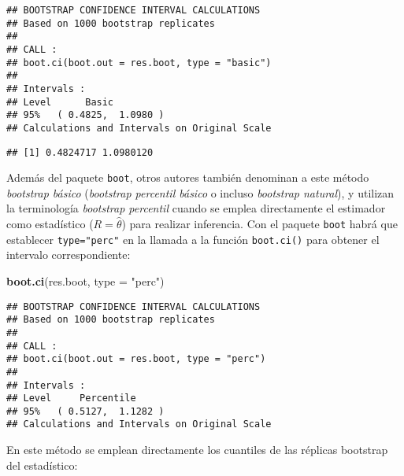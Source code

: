 \documentclass[
]{book}
\newenvironment{Shaded}{\begin{snugshade}}{\end{snugshade}}
\newcommand{\CommentTok}[1]{\textcolor[rgb]{0.56,0.35,0.01}{\textit{#1}}}
\newcommand{\DataTypeTok}[1]{\textcolor[rgb]{0.13,0.29,0.53}{#1}}
\newcommand{\DecValTok}[1]{\textcolor[rgb]{0.00,0.00,0.81}{#1}}
\newcommand{\KeywordTok}[1]{\textcolor[rgb]{0.13,0.29,0.53}{\textbf{#1}}}
\newcommand{\NormalTok}[1]{#1}
\newcommand{\OperatorTok}[1]{\textcolor[rgb]{0.81,0.36,0.00}{\textbf{#1}}}
\newcommand{\StringTok}[1]{\textcolor[rgb]{0.31,0.60,0.02}{#1}}
\theoremstyle{definition}
\theoremstyle{definition}
\theoremstyle{definition}
\theoremstyle{remark}
\begin{document}
\begin{verbatim}
## BOOTSTRAP CONFIDENCE INTERVAL CALCULATIONS
## Based on 1000 bootstrap replicates
## 
## CALL : 
## boot.ci(boot.out = res.boot, type = "basic")
## 
## Intervals : 
## Level      Basic         
## 95%   ( 0.4825,  1.0980 )  
## Calculations and Intervals on Original Scale
\end{verbatim}

\begin{Shaded}
\end{Shaded}

\begin{verbatim}
## [1] 0.4824717 1.0980120
\end{verbatim}

Además del paquete \texttt{boot}, otros autores también denominan a este método
\emph{bootstrap básico} (\emph{bootstrap percentil básico} o incluso \emph{bootstrap natural}),
y utilizan la terminología \emph{bootstrap percentil} cuando se emplea
directamente el estimador como estadístico (\(R = \hat \theta\)) para
realizar inferencia. Con el paquete \texttt{boot} habrá que establecer \texttt{type="perc"}
en la llamada a la función \texttt{boot.ci()} para obtener el intervalo
correspondiente:

\begin{Shaded}
\begin{Highlighting}[]
\KeywordTok{boot.ci}\NormalTok{(res.boot, }\DataTypeTok{type =} \StringTok{"perc"}\NormalTok{)}
\end{Highlighting}
\end{Shaded}

\begin{verbatim}
## BOOTSTRAP CONFIDENCE INTERVAL CALCULATIONS
## Based on 1000 bootstrap replicates
## 
## CALL : 
## boot.ci(boot.out = res.boot, type = "perc")
## 
## Intervals : 
## Level     Percentile     
## 95%   ( 0.5127,  1.1282 )  
## Calculations and Intervals on Original Scale
\end{verbatim}

En este método se emplean directamente los cuantiles de las
réplicas bootstrap del estadístico:

\begin{Shaded}
\end{Shaded}
\end{document}
